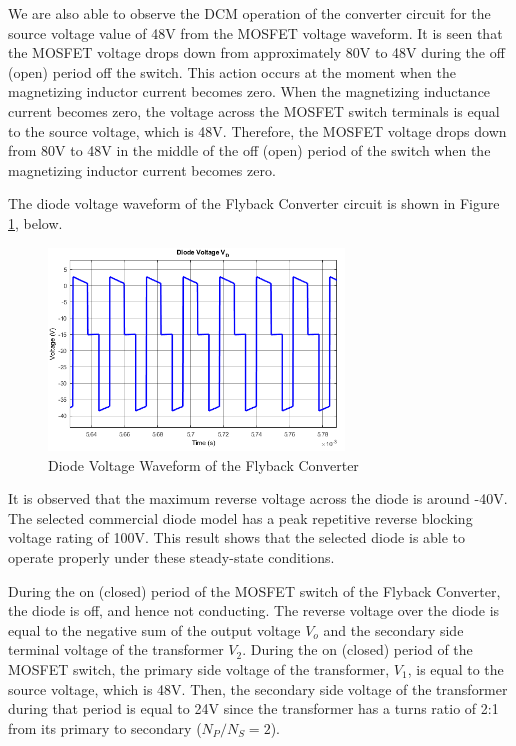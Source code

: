 We are also able to observe the DCM operation of the converter circuit for the source voltage value of 48V from the MOSFET voltage waveform. It is seen that the MOSFET voltage drops down from approximately 80V to 48V during the off (open) period off the switch. This action occurs at the moment when the magnetizing inductor current becomes zero. When the magnetizing inductance current becomes zero, the voltage across the MOSFET switch terminals is equal to the source voltage, which is 48V. Therefore, the MOSFET voltage drops down from 80V to 48V in the middle of the off (open) period of the switch when the magnetizing inductor current becomes zero.

The diode voltage waveform of the Flyback Converter circuit is shown in Figure \ref{fig:diode48}, below.

\begin{figure}[H]
\begin{center}
\includegraphics[width=0.7\textwidth]{figures/V_D_48.png}
\caption{Diode Voltage Waveform of the Flyback Converter}
\label{fig:diode48}
\end{center}
\end{figure}

It is observed that the maximum reverse voltage across the diode is around -40V. The selected commercial diode model has a peak repetitive reverse blocking voltage rating of 100V. This result shows that the selected diode is able to operate properly under these steady-state conditions.

During the on (closed) period of the MOSFET switch of the Flyback Converter, the diode is off, and hence not conducting. The reverse voltage over the diode is equal to the negative sum of the output voltage $V_o$ and the secondary side terminal voltage of the transformer $V_2$. During the on (closed) period of the MOSFET switch, the primary side voltage of the transformer, $V_1$, is equal to the source voltage, which is 48V. Then, the secondary side voltage of the transformer during that period is equal to 24V since the transformer has a turns ratio of 2:1 from its primary to secondary ($N_P/N_S = 2$).

